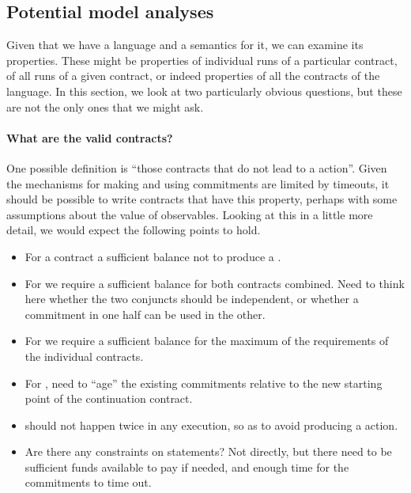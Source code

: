 \documentclass[
      acmsmall
    , screen
    , review=true
  ]{acmart}
\begin{document}
\subsection{Potential model analyses}
\label{section:analysis}

Given that we have a language and a semantics for it, we can examine its properties. These might be properties of 
individual runs of a particular contract, of all runs of a given contract, or indeed properties of all the contracts of 
the language. In this section, we look at two particularly obvious questions, but these are not the only ones that we 
might ask.



\paragraph{What are the valid contracts?}

One possible definition is ``those contracts that do not lead to a  action''.
Given the mechanisms for making and using commitments are limited by timeouts, it should be possible to write contracts that have this property, perhaps with some assumptions about the value of observables.
Looking at this in a little more detail, we would expect the following points to hold.
\begin{itemize}
\item For a  contract a sufficient balance not to produce a .
\item For  we require a sufficient balance for both contracts combined. Need to think here whether the two conjuncts should be independent, or whether a commitment in one half can be used in the other.
\item For  we require a sufficient balance for the maximum of the requirements of the individual contracts. 
\item For , need to ``age'' the existing commitments relative to the new starting point of the 
continuation contract.
\item {} should not happen twice in any execution, so as to avoid producing a
 action.
\item Are there any constraints on  statements? Not directly, but there need to be sufficient 
funds available to pay if needed, and enough time for the commitments to time out.
\end{itemize}
\end{document}

